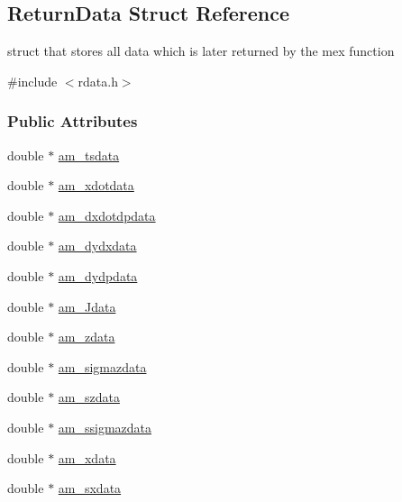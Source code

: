 \hypertarget{struct_return_data}{}\subsection{Return\+Data Struct Reference}
\label{struct_return_data}


struct that stores all data which is later returned by the mex function  




{\ttfamily \#include $<$rdata.\+h$>$}

\subsubsection*{Public Attributes}
\begin{DoxyCompactItemize}
\item 
double $\ast$ \hyperlink{struct_return_data_a577298549da7c9dbe3d93fbf3bc17866}{am\+\_\+tsdata}
\item 
double $\ast$ \hyperlink{struct_return_data_a3ea8fa08fcced0827c1df276b0d253c8}{am\+\_\+xdotdata}
\item 
double $\ast$ \hyperlink{struct_return_data_a494b13e9797d95d7fb3c89e09864aa4f}{am\+\_\+dxdotdpdata}
\item 
double $\ast$ \hyperlink{struct_return_data_a831cada35b4f407a2c8ad789dfc534e5}{am\+\_\+dydxdata}
\item 
double $\ast$ \hyperlink{struct_return_data_a57a7eb2085d8ed5bb6c62331a2aa3af5}{am\+\_\+dydpdata}
\item 
double $\ast$ \hyperlink{struct_return_data_a82d71415ca06c969ebd22a02e4789b1d}{am\+\_\+\+Jdata}
\item 
double $\ast$ \hyperlink{struct_return_data_ab9982c7bbb81e3d54ab0a2f8b6e1ccec}{am\+\_\+zdata}
\item 
double $\ast$ \hyperlink{struct_return_data_a66bdea39e20521b851fedec7fca7a30b}{am\+\_\+sigmazdata}
\item 
double $\ast$ \hyperlink{struct_return_data_a8191e336c3631c7e32882e1ce560f953}{am\+\_\+szdata}
\item 
double $\ast$ \hyperlink{struct_return_data_aacb72a03b1cb6b4c9e8d4fde06afd109}{am\+\_\+ssigmazdata}
\item 
double $\ast$ \hyperlink{struct_return_data_ad99b08eb835733c2416a1a0004e4a491}{am\+\_\+xdata}
\item 
double $\ast$ \hyperlink{struct_return_data_a84576ca797cb9aedbbc5a366c52f54c9}{am\+\_\+sxdata}
\item 

\end{DoxyCompactItemize}
